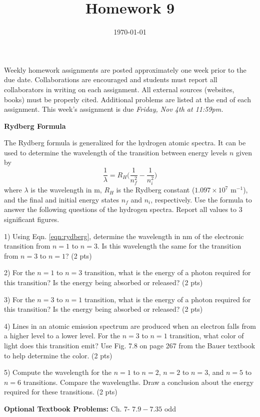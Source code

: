 \documentclass[12pt]{article}
\title{\textbf{Homework 9}}
\date{\vspace{-2em}\today}
\begin{document}
\maketitle 

Weekly homework assignments are posted approximately one week prior to the
due date. Collaborations are encouraged and students must report all collaborators
in writing on each assignment. All external sources (websites, books) must be
properly cited. Additional problems are listed at the end of each assignment.
This week's assignment is due \textit{Friday, Nov 4th at 11:59pm.}

\textbf{Rydberg Formula}

The Rydberg formula is generalized for the hydrogen atomic spectra. It
can be used to determine the wavelength of the transition between energy levels
$n$ given by
\begin{equation}
  \frac{1}{\lambda} = R_H\Big(\frac{1}{n_f^2}-\frac{1}{n_i^2}\Big)
  \label{eqn:rydberg}
\end{equation}
where $\lambda$ is the wavelength in m, $R_H$ is the Rydberg constant
($1.097 \times 10^7$ m$^{-1}$), and the final and initial energy states $n_f$ and
$n_i$, respectively. Use the formula to answer the following questions of the
hydrogen spectra. Report all values to 3 significant figures.

1) Using Eqn. \ref{eqn:rydberg}, determine the wavelength in nm of the electronic
transition from $n=1$ to $n=3$. Is this wavelength the same for the transition from
$n=3$ to $n=1$? (2 pts)

\vspace{1.75in}

2) For the $n=1$ to $n=3$ transition, what is the energy of a photon required for
this transition? Is the energy being absorbed or released? (2 pts)

\vspace{2in}

3) For the $n=3$ to $n=1$ transition, what is the energy of a photon required for
this transition? Is the energy being absorbed or released? (2 pts)

\vspace{2in}

4) Lines in an atomic emission spectrum are produced when an electron falls from
a higher level to a lower level. For the $n=3$ to $n=1$ transition, what color
of light does this transition emit? Use Fig. 7.8 on page 267 from the Bauer textbook
to help determine the color. (2 pts)

\vspace{2in}

5) Compute the wavelength for the $n=1$ to $n=2$, $n=2$ to $n=3$, and $n=5$ to $n=6$ transitions.
Compare the wavelengths. Draw a conclusion about the energy required for these transitions.
(2 pts) 

\vfill

\textbf{Optional Textbook Problems:} Ch. 7- $7.9 - 7.35$ odd
\end{document}
